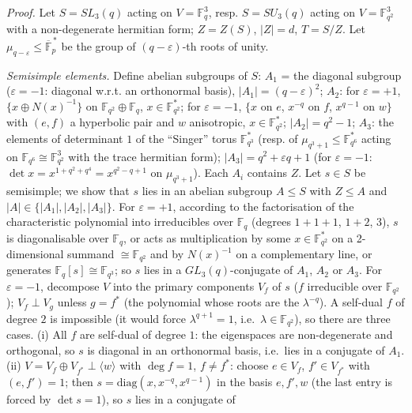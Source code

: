 \documentclass[11pt,a4paper]{article}
\begin{document}
\emph{Proof.} Let \(S=SL_3(q)\) acting on \(V=\mathbb F_q^3\), resp.
\(S=SU_3(q)\) acting on \(V=\mathbb F_{q^2}^3\) with a non-degenerate
hermitian form; \(Z=Z(S)\), \(|Z|=d\), \(T=S/Z\). Let
\(\mu_{q-\varepsilon}\le\overline{\mathbb F}_p^{\,*}\) be the group of
\((q-\varepsilon)\)-th roots of unity.

\emph{Semisimple elements.} Define abelian subgroups of \(S\): \(A_1\) =
the diagonal subgroup (\(\varepsilon=-1\): diagonal w.r.t. an
orthonormal basis), \(|A_1|=(q-\varepsilon)^2\); \(A_2\): for
\(\varepsilon=+1\), \(\{x\oplus N(x)^{-1}\}\) on
\(\mathbb F_{q^2}\oplus\mathbb F_q\), \(x\in\mathbb F_{q^2}^*\); for
\(\varepsilon=-1\), \(\{x\) on \(e\), \(x^{-q}\) on \(f\), \(x^{q-1}\)
on \(w\}\) with \((e,f)\) a hyperbolic pair and \(w\) anisotropic,
\(x\in\mathbb F_{q^2}^*\); \(|A_2|=q^2-1\); \(A_3\): the elements of
determinant \(1\) of the ``Singer'' torus \(\mathbb F_{q^3}^*\) (resp.
of \(\mu_{q^3+1}\le\mathbb F_{q^6}^*\) acting on
\(\mathbb F_{q^6}\cong\mathbb F_{q^2}^3\) with the trace hermitian
form); \(|A_3|=q^2+\varepsilon q+1\) (for \(\varepsilon=-1\):
\(\det x=x^{1+q^2+q^4}=x^{q^2-q+1}\) on \(\mu_{q^3+1}\)). Each \(A_i\)
contains \(Z\). Let \(s\in S\) be semisimple; we show that \(s\) lies in
an abelian subgroup \(A\le S\) with \(Z\le A\) and
\(|A|\in\{|A_1|,|A_2|,|A_3|\}\). For \(\varepsilon=+1\), according to
the factorisation of the characteristic polynomial into irreducibles
over \(\mathbb F_q\) (degrees \(1+1+1\), \(1+2\), \(3\)), \(s\) is
diagonalisable over \(\mathbb F_q\), or acts as multiplication by some
\(x\in\mathbb F_{q^2}^*\) on a 2-dimensional summand
\(\cong\mathbb F_{q^2}\) and by \(N(x)^{-1}\) on a complementary line,
or generates \(\mathbb F_q[s]\cong\mathbb F_{q^3}\); so \(s\) lies in a
\(GL_3(q)\)-conjugate of \(A_1\), \(A_2\) or \(A_3\). For
\(\varepsilon=-1\), decompose \(V\) into the primary components \(V_f\)
of \(s\) (\(f\) irreducible over \(\mathbb F_{q^2}\)); \(V_f\perp V_g\)
unless \(g=f^*\) (the polynomial whose roots are the \(\lambda^{-q}\)).
A self-dual \(f\) of degree \(2\) is impossible (it would force
\(\lambda^{q+1}=1\), i.e.~\(\lambda\in\mathbb F_{q^2}\)), so there are
three cases. (i) All \(f\) are self-dual of degree \(1\): the
eigenspaces are non-degenerate and orthogonal, so \(s\) is diagonal in
an orthonormal basis, i.e.~lies in a conjugate of \(A_1\). (ii)
\(V=V_f\oplus V_{f^*}\perp\langle w\rangle\) with \(\deg f=1\),
\(f\ne f^*\): choose \(e\in V_f\), \(f'\in V_{f^*}\) with \((e,f')=1\);
then \(s=\mathrm{diag}(x,x^{-q},x^{q-1})\) in the basis \(e,f',w\) (the
last entry is forced by \(\det s=1\)), so \(s\) lies in a conjugate of
\end{document}
